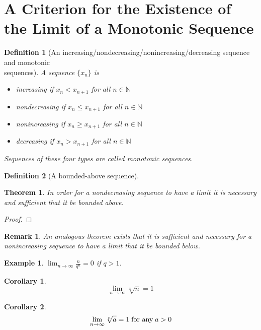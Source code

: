 \documentclass[onecolumn]{ctexart}
\newtheorem{definition}{Definition}
\newtheorem{theorem}{Theorem}
\newtheorem{corollary}{Corollary}
\newtheorem{remark}{Remark}
\newtheorem{example}{Example}
\begin{document}
\section{A Criterion for the Existence of the Limit of a Monotonic Sequence}

\begin{definition}[An increasing/nondecreasing/nonincreasing/decreasing sequence and monotonic \\ sequences]
  A sequence $\lbrace x_n \rbrace$ is
  \begin{itemize}
    \item increasing if $x_n < x_{n+1}$ for all $n \in \mathbb{N}$
    \item nondecreasing if $x_n \leq x_{n+1}$ for all $n \in \mathbb{N}$
    \item nonincreasing if $x_n \geq x_{n+1}$ for all $n \in \mathbb{N}$
    \item decreasing if $x_n > x_{n+1}$ for all $n \in \mathbb{N}$
  \end{itemize}

  Sequences of these four types are called monotonic sequences.
\end{definition}

\begin{definition}[A bounded-above sequence]
  
\end{definition}

\begin{theorem}
  In order for a nondecreasing sequence to have a limit it is necessary and 
  sufficient that it be bounded above.
\end{theorem}
\begin{proof}
  
\end{proof}
\begin{remark}
  An analogous theorem exists that it is sufficient and necessary for a 
  nonincreasing sequence to have a limit that it be bounded below.
\end{remark}

\begin{example}
  $\lim_{n \to \infty} \frac{n}{q^n} = 0$ if $q > 1$.
\end{example}

\begin{corollary}
  \[
    \lim_{n \to \infty} \sqrt[n]{n} = 1
  \]
\end{corollary}

\begin{corollary}
  \[
    \lim_{n \to \infty} \sqrt[n]{a} = 1 \thickspace \textnormal{for any} \thickspace a > 0
  \]
\end{corollary}
\end{document}
